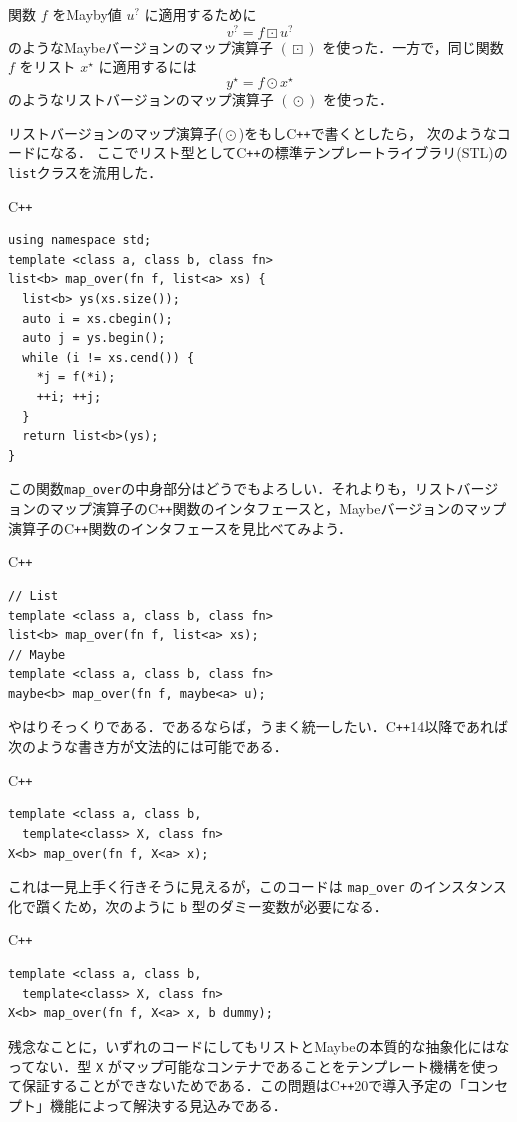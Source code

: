 \documentclass[a4paper,twocolumn]{jsbook}
\newcommand{\programminglanguage}[1]{\textsf{#1}}
\newcommand{\cxx}{\programminglanguage{C}\texttt{++}}
\newcommand{\cxxfourteen}{\cxx\programminglanguage{14}}
\newcommand{\cxxtwelve}{\cxx\programminglanguage{20}}
\newcommand{\code}[1]{\texttt{#1}}
\newenvironment{cxxcode}{\begin{itembox}[r]{\cxx}}{\end{itembox}}
\DeclareMathOperator{\mMapList}{\odot}
\DeclareMathOperator{\mMapMaybe}{\boxdot}
\newcommand{\mList}[1]{{#1}^\mathrm{\star}}
\newcommand{\mMaybe}[1]{{#1}^?}
\begin{document}
関数 $f$ をMayby値 $\mMaybe{u}$ に適用するために
\begin{equation}
\mMaybe{v}=f\mMapMaybe\mMaybe{u}
\end{equation}
のようなMaybeバージョンのマップ演算子 $(\mMapMaybe)$ を使った．一方で，同じ関数 $f$ をリスト $\mList{x}$ に適用するには
\begin{equation}
\mList{y}=f\mMapList\mList{x}
\end{equation}
のようなリストバージョンのマップ演算子 $(\mMapList)$ を使った．

リストバージョンのマップ演算子($\mMapList$)をもし\cxx で書くとしたら，
次のようなコードになる．
ここでリスト型として\cxx の標準テンプレートライブラリ(STL)の
\code{list}クラスを流用した．
\begin{cxxcode}
\begin{verbatim}
using namespace std;
template <class a, class b, class fn>
list<b> map_over(fn f, list<a> xs) {
  list<b> ys(xs.size());
  auto i = xs.cbegin();
  auto j = ys.begin();
  while (i != xs.cend()) {
    *j = f(*i);
    ++i; ++j;
  }
  return list<b>(ys);
}
\end{verbatim}
\end{cxxcode}
この関数\code{map\_over}の中身部分はどうでもよろしい．それよりも，リストバージョンのマップ演算子の\cxx 関数のインタフェースと，Maybeバージョンのマップ演算子の\cxx 関数のインタフェースを見比べてみよう．
\begin{cxxcode}
\begin{verbatim}
// List
template <class a, class b, class fn>
list<b> map_over(fn f, list<a> xs);
// Maybe
template <class a, class b, class fn>
maybe<b> map_over(fn f, maybe<a> u);
\end{verbatim}
\end{cxxcode}
やはりそっくりである．であるならば，うまく統一したい．\cxxfourteen 以降であれば次のような書き方が文法的には可能である．
\begin{cxxcode}
\begin{verbatim}
template <class a, class b,
  template<class> X, class fn>
X<b> map_over(fn f, X<a> x);
\end{verbatim}
\end{cxxcode}
これは一見上手く行きそうに見えるが，このコードは \code{map\_over} のインスタンス化で躓くため，次のように \code{b} 型のダミー変数が必要になる．
\begin{cxxcode}
\begin{verbatim}
template <class a, class b,
  template<class> X, class fn>
X<b> map_over(fn f, X<a> x, b dummy);
\end{verbatim}
\end{cxxcode}
残念なことに，いずれのコードにしてもリストとMaybeの本質的な抽象化にはなってない．型 \code{X} がマップ可能なコンテナであることをテンプレート機構を使って保証することができないためである．この問題は\cxxtwelve で導入予定の「コンセプト」機能によって解決する見込みである．
\end{document}
